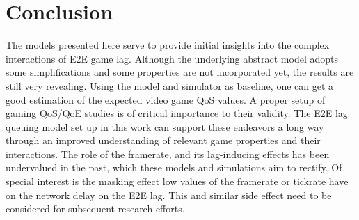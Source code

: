 \section{Conclusion}
\label{sec:conclusion}



The models presented here serve to provide initial insights into the complex interactions of \gls{E2E} game lag. Although the underlying abstract model adopts some simplifications and some properties are not incorporated yet, the results are still very revealing. Using the model and simulator as baseline, one can get a good estimation of the expected video game \gls{QoS} values. 
A proper setup of gaming \gls{QoS}/\gls{QoE} studies is of critical importance to their validity. The \gls{E2E} lag queuing model set up in this work can support these endeavors a long way through an improved understanding of relevant game properties and their interactions. The role of the framerate, and its lag-inducing effects has been undervalued in the past, which these models and simulations aim to rectify. Of special interest is the masking effect low values of the framerate or tickrate have on the network delay on the \gls{E2E} lag. This and similar side effect need to be considered for subsequent research efforts.